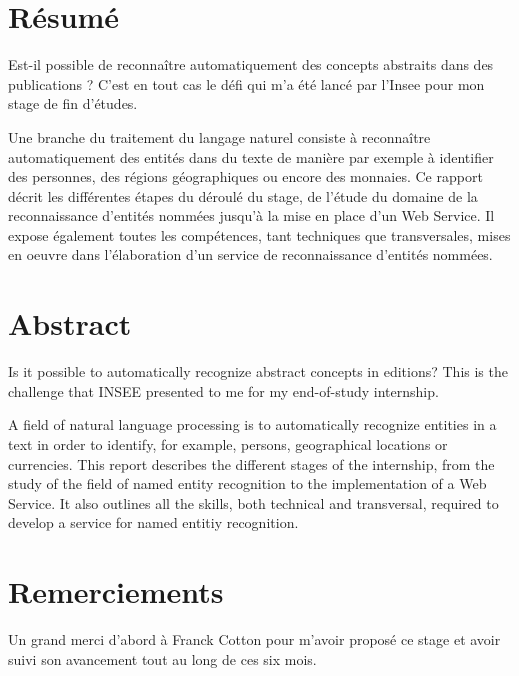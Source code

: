 \documentclass[11pt, oneside, a4paper, titlepage, french]{article}
\begin{document}

\begin{titlepage}

\end{titlepage}

\thispagestyle{empty}
\newpage

\section*{Résumé}
Est-il possible de reconnaître automatiquement des concepts abstraits dans des publications ? C'est en tout cas le défi qui m'a été lancé par l'Insee pour mon stage de fin d'études.
\newline

Une branche du traitement du langage naturel consiste à reconnaître automatiquement des entités dans du texte de manière par exemple à identifier des personnes, des régions géographiques ou encore des monnaies. Ce rapport décrit les différentes étapes du déroulé du stage, de l'étude du domaine de la reconnaissance d'entités nommées jusqu'à la mise en place d'un Web Service. Il expose également toutes les compétences, tant techniques que transversales, mises en oeuvre dans l'élaboration d'un service de reconnaissance d'entités nommées.
\newpage

\section*{Abstract}
Is it possible to automatically recognize abstract concepts in editions? This is the challenge that INSEE presented to me for my end-of-study internship.
\newline

A field of natural language processing is to automatically recognize entities in a text in order to identify, for example, persons, geographical locations or currencies. This report describes the different stages of the internship, from the study of the field of named entity recognition to the implementation of a Web Service. It also outlines all the skills, both technical and transversal, required to develop a service for named entitiy recognition.
\newpage

\section*{Remerciements}
Un grand merci d'abord à Franck Cotton pour m'avoir proposé ce stage et avoir suivi son avancement tout au long de ces six mois.
\newline
\end{document}
